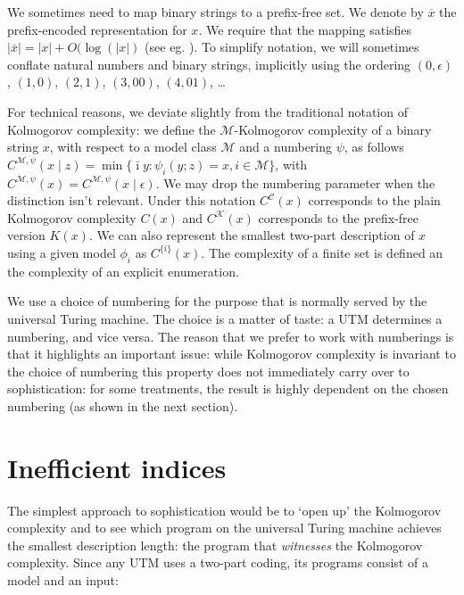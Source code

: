 \documentclass{style/llncs}
\newcommand{\M}{\mathscr M}
\newcommand{\C}{\mathscr C}
\newcommand{\K}{\mathscr K}
\newcommand{\br}[1]{\overline{#1}}
\begin{document}
We sometimes need to map binary strings to a prefix-free set. We denote by $\br{x}$ the prefix-encoded representation for $x$. We require that the mapping satisfies $|\br{x}| = |x|+O(\log(|x|)$ (see eg. \cite[Section~1.4]{li1993introduction}). To simplify notation, we will sometimes conflate natural numbers and binary strings, implicitly using the ordering $(0, \epsilon)$, $(1, 0)$, $(2, 1)$, $(3, 00)$, $(4, 01)$, \ldots  

For technical reasons, we deviate slightly from the traditional notation of Kolmogorov complexity: we define the $\M$-Kolmogorov complexity of a binary string $x$, with respect to a model class $\M$ and a numbering $\psi$, as follows $C^{\M,\psi}(x\mid z)=\min\{\bar\imath y:\psi_i(y; z)=x,i\in\M\}$, with $C^{\M,\psi}(x) = C^{\M,\psi}(x\mid \epsilon)$. We may drop the numbering parameter when the distinction isn't relevant. Under this notation $C^\C(x)$ corresponds to the plain Kolmogorov complexity $C(x)$ and $C^\K(x)$ corresponds to the prefix-free version $K(x)$. We can also represent the smallest two-part description of $x$ using a given model $\phi_i$ as $C^{\{i\}}(x)$. The complexity of a finite set is defined an the complexity of an explicit enumeration.

We use a choice of numbering for the purpose that is normally served by the universal Turing machine. The choice is a matter of taste: a UTM determines a numbering, and vice versa. The reason that we prefer to work with numberings is that it highlights an important issue: while Kolmogorov complexity is invariant to the choice of numbering this property does not immediately carry over to sophistication: for some treatments, the result is highly dependent on the chosen numbering (as shown in the next section). 
 
\section{Inefficient indices}
\label{section:indices}

The simplest approach to sophistication would be to `open up' the Kolmogorov complexity and to see which program on the universal Turing machine achieves the smallest description length: the program that \emph{witnesses} the Kolmogorov complexity. Since any UTM uses a two-part coding, its programs consist of a model and an input:
\end{document}
